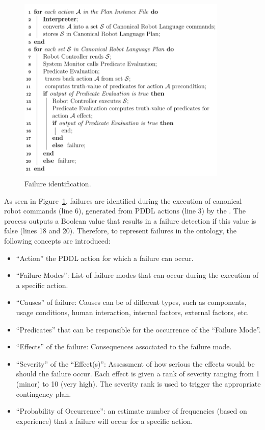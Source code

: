 \begin{figure}[h!t!]
  \centering
  \includegraphics[width=10cm]{images/algorithm.pdf}
  \caption{Failure identification.}
  \label{fig:algo}
\end{figure}

As seen in Figure~\ref{fig:algo}, failures are identified during the execution of canonical robot commands (line 6), generated from PDDL actions (line 3) by the . The  process outputs a Boolean value that results in a failure detection if this value is false (lines 18 and 20). Therefore, to represent failures in the  ontology, the following concepts are introduced:
\begin{itemize}
 \item ``Action'' the PDDL action for which a failure can occur.
 \item ``Failure Modes'': List of failure modes that can occur during the execution of a specific action.
 \item ``Causes'' of failure: Causes can be of different types, such as  components, usage conditions, human interaction, internal factors, external factors, etc.
 \item ``Predicates'' that can be responsible for the occurrence of the ``Failure Mode''.
 \item ``Effects'' of the failure: Consequences associated to the failure mode.
 \item ``Severity'' of the ``Effect(s)'': Assessment of how serious the effects would be should the failure occur. Each effect is given a rank of severity ranging from 1 (minor) to 10 (very high). The severity rank is used to trigger the appropriate contingency plan.
 \item ``Probability of Occurrence'': an estimate number of frequencies (based on experience) that a failure will occur for a specific action.
\end{itemize}

